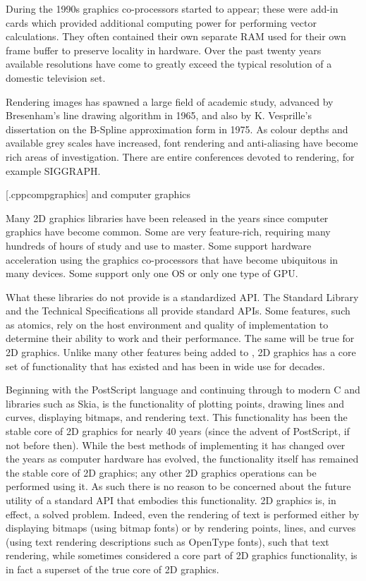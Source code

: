 \pnum
During the 1990s graphics co-processors started to appear; these were add-in cards which provided additional computing power for performing vector calculations. They often contained their own separate RAM used for their own frame buffer to preserve locality in hardware. Over the past twenty years available resolutions have come to greatly exceed the typical resolution of a domestic television set.

\pnum
Rendering images has spawned a large field of academic study, advanced by Bresenham’s line drawing algorithm in 1965, and also by K. Vesprille’s dissertation on the B-Spline approximation form in 1975. As colour depths and available grey scales have increased, font rendering and anti-aliasing have become rich areas of investigation. There are entire conferences devoted to rendering, for example SIGGRAPH.

[\iotwod.cppcompgraphics]{\Cpp{} and computer graphics}

\pnum
Many \Cpp{} 2D graphics libraries have been released in the years since computer graphics have become common. Some are very feature-rich, requiring many hundreds of hours of study and use to master. Some support hardware acceleration using the graphics co-processors that have become ubiquitous in many devices. Some support only one OS or only one type of GPU.

\pnum
What these libraries do not provide is a standardized \Cpp{} API. The \Cpp{} Standard Library and the \Cpp{} Technical Specifications all provide standard \Cpp{} APIs. Some features, such as atomics, rely on the host environment and quality of implementation to determine their ability to work and their performance. The same will be true for 2D graphics. Unlike many other features being added to \Cpp{}, 2D graphics has a core set of functionality that has existed and has been in wide use for decades.

\pnum
Beginning with the PostScript language and continuing through to modern C and \Cpp libraries such as Skia, is the functionality of plotting points, drawing lines and curves, displaying bitmaps, and rendering text. This functionality has been the stable core of 2D graphics for nearly 40 years (since the advent of PostScript, if not before then). While the best methods of implementing it has changed over the years as computer hardware has evolved, the functionality itself has remained the stable core of 2D graphics; any other 2D graphics operations can be performed using it. As such there is no reason to be concerned about the future utility of a standard \Cpp{} API that embodies this functionality. 2D graphics is, in effect, a solved problem. Indeed, even the rendering of text is performed either by displaying bitmaps (using bitmap fonts) or by rendering points, lines, and curves (using text rendering descriptions such as OpenType fonts), such that text rendering, while sometimes considered a core part of 2D graphics functionality, is in fact a superset of the true core of 2D graphics. 

